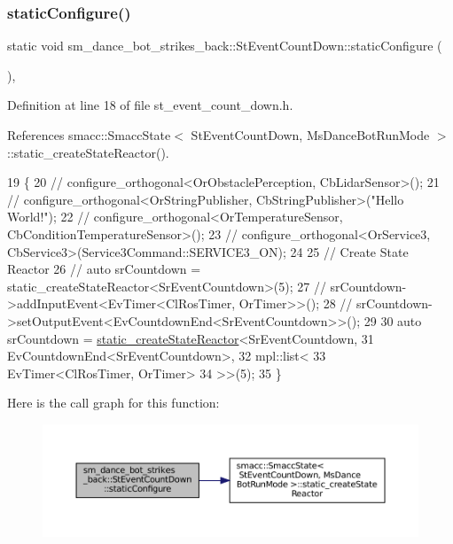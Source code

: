 \subsubsection{\texorpdfstring{static\+Configure()}{staticConfigure()}}
{\footnotesize\ttfamily static void sm\+\_\+dance\+\_\+bot\+\_\+strikes\+\_\+back\+::\+St\+Event\+Count\+Down\+::static\+Configure (\begin{DoxyParamCaption}{ }\end{DoxyParamCaption})\hspace{0.3cm}{\ttfamily [inline]}, {\ttfamily [static]}}



Definition at line 18 of file st\+\_\+event\+\_\+count\+\_\+down.\+h.



References smacc\+::\+Smacc\+State$<$ St\+Event\+Count\+Down, Ms\+Dance\+Bot\+Run\+Mode $>$\+::static\+\_\+create\+State\+Reactor().


\begin{DoxyCode}
19     \{
20         \textcolor{comment}{//   configure\_orthogonal<OrObstaclePerception, CbLidarSensor>();}
21         \textcolor{comment}{//   configure\_orthogonal<OrStringPublisher, CbStringPublisher>("Hello World!");}
22         \textcolor{comment}{//   configure\_orthogonal<OrTemperatureSensor, CbConditionTemperatureSensor>();}
23         \textcolor{comment}{//   configure\_orthogonal<OrService3, CbService3>(Service3Command::SERVICE3\_ON);        }
24         
25         \textcolor{comment}{// Create State Reactor}
26         \textcolor{comment}{// auto srCountdown = static\_createStateReactor<SrEventCountdown>(5);        }
27         \textcolor{comment}{// srCountdown->addInputEvent<EvTimer<ClRosTimer, OrTimer>>();}
28         \textcolor{comment}{// srCountdown->setOutputEvent<EvCountdownEnd<SrEventCountdown>>();}
29 
30         \textcolor{keyword}{auto} srCountdown = \hyperlink{classsmacc_1_1SmaccState_a892be704b48f93bf5c35635d1a58ed54}{static\_createStateReactor}<SrEventCountdown, 
31                                                     EvCountdownEnd<SrEventCountdown>, 
32                                                     mpl::list<
33                                                             EvTimer<ClRosTimer, OrTimer>
34                                                             >>(5);
35     \}
\end{DoxyCode}
Here is the call graph for this function\+:
\nopagebreak
\begin{figure}[H]
\begin{center}
\leavevmode
\includegraphics[width=350pt]{structsm__dance__bot__strikes__back_1_1StEventCountDown_a2b0d518bcc72065392d547d69c0dff7d_cgraph}
\end{center}
\end{figure}


